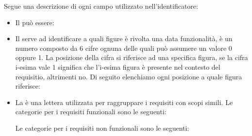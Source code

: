 \noindent
Segue una descrizione di ogni campo utilizzato nell'identificatore:
\begin{itemize}
	\item Il  può essere:

	\item Il  serve ad identificare a quali figure è rivolta una data funzionalità, è un numero composto da 6 cifre ognuna delle quali può assumere un valore 0 oppure 1. La posizione della cifra si riferisce ad una specifica figura, se la cifra i-esima vale 1 significa che l'i-esima figura è presente nel contesto del requisitio, altrimenti no.
	Di seguito elenchiamo ogni posizione a quale figura riferisce: 

	\item La  è una lettera utilizzata per raggruppare i requisiti con scopi simili.
	Le categorie per i requisiti funzionali sono le seguenti:
	Le categorie per i requisiti non funzionali sono le seguenti:
\end{itemize}
